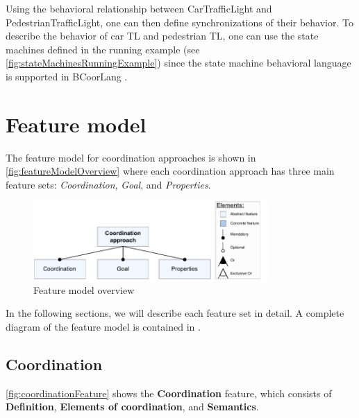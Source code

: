 \documentclass[runningheads]{llncs}
\begin{document}
Using the behavioral relationship between \textsf{CarTrafficLight} and \textsf{PedestrianTrafficLight}, one can then define synchronizations of their behavior.
To describe the behavior of car TL and pedestrian TL, one can use the state machines defined in the running example (see \autoref{fig:stateMachinesRunningExample}) since the state machine behavioral language is supported in BCoorLang \cite{krauterBehavioralConsistencyMultimodeling2023}.


\section{Feature model} \label{sec:features}
The feature model for coordination approaches is shown in \autoref{fig:featureModelOverview} where each coordination approach has three main feature sets: \textit{Coordination}, \textit{Goal}, and \textit{Properties}.

\begin{figure}[ht]
	\centering
	\includegraphics[width=0.8\textwidth]{images/root}
	\caption{Feature model overview}
	\label{fig:featureModelOverview}
\end{figure}

In the following sections, we will describe each feature set in detail.
A complete diagram of the feature model is contained in \cite{timkrauterArtifactsCoordination2024}.

\subsection{Coordination}

\autoref{fig:coordinationFeature} shows the \textbf {Coordination} feature, which consists of \textbf{Definition}, \textbf{Elements of coordination}, and \textbf{Semantics}.
\end{document}
